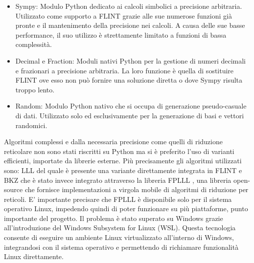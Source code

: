 \begin{itemize}
    \item Sympy: Modulo Python dedicato ai calcoli simbolici a precisione arbitraria.
    Utilizzato come supporto a FLINT grazie alle sue numerose funzioni già pronte e il 
    mantenimento della precisione nei calcoli. A causa delle sue basse performance, il suo
    utilizzo è strettamente limitato a funzioni di bassa complessità.
    \item Decimal e Fraction: Moduli nativi Python per la gestione di numeri decimali e 
    frazionari a precisione arbitraria. La loro funzione è quella di sostituire FLINT ove 
    esso non può fornire una soluzione diretta o dove Sympy risulta troppo lento.
    \item Random: Modulo Python nativo che si occupa di generazione pseudo-casuale di dati.
    Utilizzato solo ed esclusivamente per la generazione di basi e vettori randomici. 
\end{itemize}

Algoritmi complessi e dalla necessaria precisione come quelli di riduzione reticolare non 
sono stati riscritti su Python ma si è preferito l'uso di varianti efficienti, importate
da librerie esterne. Più precisamente gli algoritmi utilizzati sono: LLL del quale
è presente una variante direttamente integrata in FLINT e BKZ che è stato invece integrato
attraverso la libreria FPLLL \cite{FPLLL}, una libreria open-source che fornisce implementazioni 
a virgola mobile di algoritmi di riduzione per reticoli. 
E' importante precisare che FPLLL è disponibile solo per il sistema operativo Linux, impedendo
quindi di poter funzionare su più piattaforme, punto importante del progetto. Il problema 
è stato superato su Windows grazie all'introduzione del Windows Subsystem for Linux (WSL). 
Questa tecnologia consente di eseguire un ambiente Linux virtualizzato  
all'interno di Windows, integrandosi con il sistema operativo e permettendo di richiamare 
funzionalità Linux direttamente.

%
%

%
%
